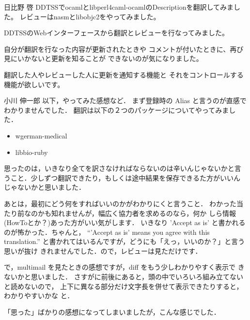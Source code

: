 \begin{prework}{日比野 啓}
DDTSSでocamlとlibperl4caml-ocamlのDescriptionを翻訳してみました。
レビューはnasmとlibobjc2をやってみました。


DDTSSのWebインターフェースから翻訳とレビューを行なってみました。


自分が翻訳を行なった内容が更新されたときや
コメントが付いたときに、再び見にいかないと更新を知ることが
できないのが気になりました。


翻訳した人やレビューした人に更新を通知する機能と
それをコントロールする機能が欲しいです。
\end{prework}

\begin{prework}{小川 伸一郎}
 以下，やってみた感想など．
 まず登録時の Alias と言うのが直感でわかりませんでした．
 翻訳は以下の２つのパッケージについてやってみました．
 \begin{itemize}
  \item wgerman-medical
  \item libbio-ruby
 \end{itemize}
 思ったのは，いきなり全てを訳さなければならないのは辛いんじゃないかと言
 うこと．少しずつ翻訳できたり，もしくは途中結果を保存できるた方がいいん
 じゃないかと思いました．

 あとは，最初にどう何をすればいいのかがわかりにくと言うこと．
 わかった当たり前なのかも知れませんが，幅広く協力者を求めるのなら，何か
 しら情報(HowToとか？)あった方がいい気がします．
 いきなり 'Accept as is' と書かれるのが怖かった．ちゃんと，
 ``'Accept as is' means you agree with this translation.''
 と書かれてはいるんですが，どうにも「えっ，いいのか？」と言う思いが抜け
 きれませんでした．ので，レビューは見ただけです．

 で，multimail を見たときの感想ですが，diff をもう少しわかりやすく表示で
 きないかと思いました．
 さすがに前後にあると，頭の中でいろいろ組み立てないと読めないので，
 上下に異なる部分だけ文字長を併せて表示できたりすると，わかりやすいかな
 と．

 「思った」ばかりの感想になってしまいましたが，こんな感じでした．
\end{prework}

